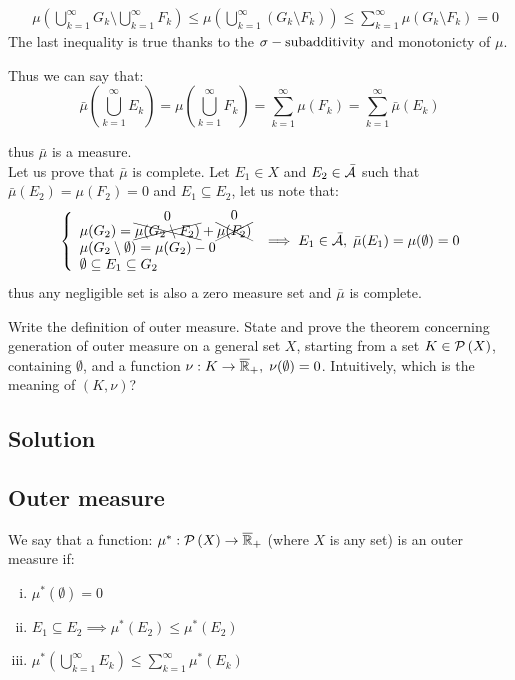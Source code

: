 \begin{itemize}
\begin{enumerate}[i)]
\begin{itemize}
\begin{align*}
                                   & \mu\left(\bigcup_{k=1}^{\infty} G_k \setminus \bigcup_{k=1}^{\infty} F_k \right) \leq \mu\left(\bigcup_{k=1}^{\infty} (G_k \setminus F_k )\right) \leq \sum_{k=1}^{\infty} \mu(G_k\setminus F_k) = 0
                              \end{align*}
                              The last inequality is true thanks to the $\sigma-\text{subadditivity}$ and monotonicty of $\mu$.
                    \end{itemize}
                    Thus we can say that:
                    \[
                        \bar{\mu}\left( \bigcup_{k=1}^{\infty} E_k \right) = \mu \left( \bigcup_{k=1}^{\infty} F_k \right) = \sum_{k=1}^{\infty} \mu(F_k) = \sum_{k=1}^{\infty} \bar{\mu}(E_k)
                    \]
          \end{enumerate}
          thus $\bar{\mu}$ is a measure.\\
          Let us prove that $\bar{\mu}$ is complete.
          Let $E_1 \in X$ and $E_2 \in \bar{\mathcal{A}}$ such that $\bar{\mu}(E_2)=\mu(F_2)=0$ and $E_1 \subseteq E_2$, let us note that:
          \[
              \left\{ \begin{array}{l}
                  \mu(G_2) = \overset{\text{\normalsize0}}{\xcancel{\mu(G_2\setminus F_2)}} + \overset{\text{\normalsize0}}{\xcancel{\mu(F_2)}}\\
                  \mu(G_2 \setminus \emptyset) = \mu(G_2) - 0                       \\
                  \emptyset \subseteq E_1 \subseteq G_2
              \end{array} \right. \implies E_1\in \bar{\mathcal{A}}, \; \bar{\mu}(E_1)=\mu(\emptyset) = 0
          \]
          thus any negligible set is also a zero measure set and $\bar{\mu}$ is complete.
\end{itemize}


\question
Write the definition of outer measure. State and prove the theorem concerning generation of
outer measure on a general set $X$, starting from a set $K \in\mathcal{P}\left(X\right)$, containing $\emptyset$, and a function
$\nu : K \to \overline{\mathbb{R}}_{+}, \; \nu(\emptyset) = 0$. Intuitively, which is the meaning of $(K, \nu)$?

\subsection*{Solution}

\subsection{Outer measure}\label{outer:def}
We say that a function: $\mu^*:\mathcal{P}\left(X\right)\to\overline{\mathbb{R}}_{+}$ (where $X$ is any set) is an outer measure if:
\begin{enumerate}[i)]
    \item $\mu^*(\emptyset)=0$
    \item \label{outer:mono}$E_1\subseteq E_2 \implies \mu^*(E_2) \leq \mu^*(E_2)$
    \item \label{outer:sub}$\mu^*\left( \bigcup_{k=1}^{\infty} E_k \right) \leq \sum_{k=1}^{\infty} \mu^*(E_k)$
\end{enumerate}

